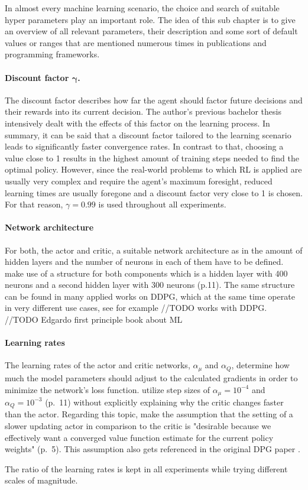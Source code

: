 In almost every machine learning scenario, the choice and search of suitable hyper parameters play an important role. The idea of this sub chapter is to give an overview of all relevant parameters, their description and some sort of default values or ranges that are mentioned numerous times in publications and programming frameworks.
\par
\paragraph{Discount factor $\boldsymbol{\gamma}$.} The discount factor describes how far the agent should factor future decisions and their rewards into its current decision. The author's previous bachelor thesis intensively dealt with the effects of this factor on the learning process. In summary, it can be said that a discount factor tailored to the learning scenario leads to significantly faster convergence rates. In contrast to that, choosing a value close to 1 results in the highest amount of training steps needed to find the optimal policy. However, since the real-world problems to which RL is applied are usually very complex and require the agent's maximum foresight, reduced learning times are usually foregone and a discount factor very close to 1 is chosen. For that reason, $\gamma = 0.99$ is used throughout all experiments.

\paragraph{Network architecture} For both, the actor and critic, a suitable network architecture as in the amount of hidden layers and the number of neurons in each of them have to be defined. \cite{lillicrap2019continuous} make use of a structure for both components which is a hidden layer with 400 neurons and a second hidden layer with 300 neurons (p.11). The same structure can be found in many applied works on DDPG, which at the same time operate in very different use cases, see for example //TODO works with DDPG.
//TODO Edgardo first principle book about ML

\paragraph{Learning rates} The learning rates of the actor and critic networks, $\alpha_\mu$ and $\alpha_Q$, determine
how much the model parameters should adjust to the calculated gradients in order to minimize the network's loss function. \cite{lillicrap2019continuous} utilize step sizes of $\alpha_\mu = 10^{-4}$ and $\alpha_Q = 10^{-3}$ (p.~11) without explicitly explaining why the critic changes faster than the actor. Regarding this topic, \cite{degris2012off} make the assumption that the setting of a slower updating actor in comparison to the critic is "desirable because we  effectively want
a converged value function estimate for the current
policy weights" (p.~5). This assumption also gets referenced in the original DPG paper \cite[p.~6]{silver2014deterministic}.
\par 
The ratio of the learning rates is kept in all experiments while trying different scales of magnitude.

